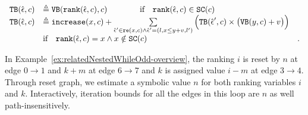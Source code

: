 \begin{defn}
{%
\[ 
\begin{array}{lll}
 {\ensuremath{\mathtt{TB}}}(\hat{\mathtt{\epsilon}{}}, c) 
 & \triangleq {\ensuremath{\mathtt{VB}}}(\mathtt{rank}(\hat{\mathtt{\epsilon}{}}, c), c) \qquad \qquad \text{if} \quad \mathtt{rank}(\hat{\mathtt{\epsilon}{}}, c) \in \mathtt{SC}(c) & \\
 {\mathtt{TB}}(\hat{\mathtt{\epsilon}{}}, c) 
 & \triangleq \mathtt{increase}(x, c) 
 + 
 \sum\limits_{\hat{\mathtt{\epsilon}{}}' \in \mathtt{re}(x, c) \land \hat{\mathtt{\epsilon}{}}' = (l, x \leq y + v, l') }
 \Big( {\mathtt{TB}}(\hat{\mathtt{\epsilon}{}}', c) \times \big( {\mathtt{VB}}(y, c) + v \big) \Big)
 & \\
 & \text{if} \quad \mathtt{rank}(\hat{\mathtt{\epsilon}{}}, c) = x \land x \notin \mathtt{SC}(c) &.
\end{array}
 \]
}
\end{defn}
In Example~\ref{ex:relatedNestedWhileOdd-overview}, the ranking $i$ is reset by $n$ at edge $0 \to 1$ and 
$k + m$ at edge $6 \to 7$ and $k$ is assigned value $i - m$ at edge $3 \to 4$. Through reset graph, 
we estimate a symbolic value $n$ for both ranking variables $i$ and $k$.
Interactively, iteration bounds for all the edges in this loop are $n$ as well path-insensitively.